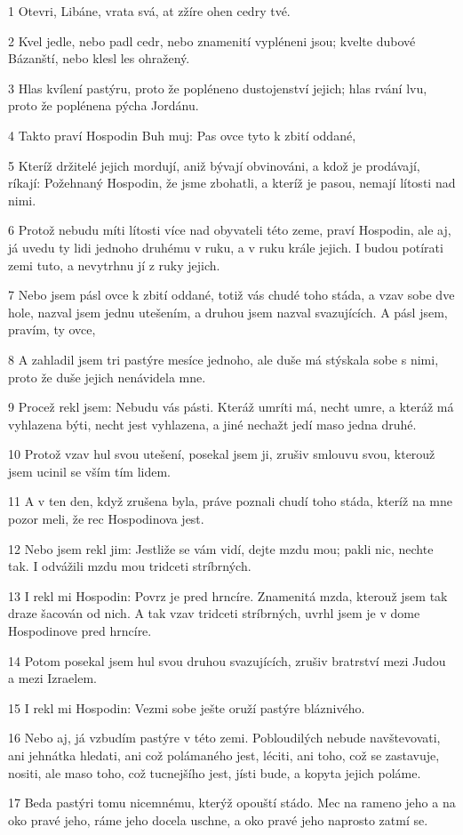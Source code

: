 \par 1 Otevri, Libáne, vrata svá, at zžíre ohen cedry tvé.
\par 2 Kvel jedle, nebo padl cedr, nebo znamenití vypléneni jsou; kvelte dubové Bázanští, nebo klesl les ohražený.
\par 3 Hlas kvílení pastýru, proto že popléneno dustojenství jejich; hlas rvání lvu, proto že poplénena pýcha Jordánu.
\par 4 Takto praví Hospodin Buh muj: Pas ovce tyto k zbití oddané,
\par 5 Kteríž držitelé jejich mordují, aniž bývají obvinováni, a kdož je prodávají, ríkají: Požehnaný Hospodin, že jsme zbohatli, a kteríž je pasou, nemají lítosti nad nimi.
\par 6 Protož nebudu míti lítosti více nad obyvateli této zeme, praví Hospodin, ale aj, já uvedu ty lidi jednoho druhému v ruku, a v ruku krále jejich. I budou potírati zemi tuto, a nevytrhnu jí z ruky jejich.
\par 7 Nebo jsem pásl ovce k zbití oddané, totiž vás chudé toho stáda, a vzav sobe dve hole, nazval jsem jednu utešením, a druhou jsem nazval svazujících. A pásl jsem, pravím, ty ovce,
\par 8 A zahladil jsem tri pastýre mesíce jednoho, ale duše má stýskala sobe s nimi, proto že duše jejich nenávidela mne.
\par 9 Procež rekl jsem: Nebudu vás pásti. Kteráž umríti má, necht umre, a kteráž má vyhlazena býti, necht jest vyhlazena, a jiné nechažt jedí maso jedna druhé.
\par 10 Protož vzav hul svou utešení, posekal jsem ji, zrušiv smlouvu svou, kterouž jsem ucinil se vším tím lidem.
\par 11 A v ten den, když zrušena byla, práve poznali chudí toho stáda, kteríž na mne pozor meli, že rec Hospodinova jest.
\par 12 Nebo jsem rekl jim: Jestliže se vám vidí, dejte mzdu mou; pakli nic, nechte tak. I odvážili mzdu mou tridceti stríbrných.
\par 13 I rekl mi Hospodin: Povrz je pred hrncíre. Znamenitá mzda, kterouž jsem tak draze šacován od nich. A tak vzav tridceti stríbrných, uvrhl jsem je v dome Hospodinove pred hrncíre.
\par 14 Potom posekal jsem hul svou druhou svazujících, zrušiv bratrství mezi Judou a mezi Izraelem.
\par 15 I rekl mi Hospodin: Vezmi sobe ješte oruží pastýre bláznivého.
\par 16 Nebo aj, já vzbudím pastýre v této zemi. Pobloudilých nebude navštevovati, ani jehnátka hledati, ani což polámaného jest, léciti, ani toho, což se zastavuje, nositi, ale maso toho, což tucnejšího jest, jísti bude, a kopyta jejich poláme.
\par 17 Beda pastýri tomu nicemnému, kterýž opouští stádo. Mec na rameno jeho a na oko pravé jeho, ráme jeho docela uschne, a oko pravé jeho naprosto zatmí se.

